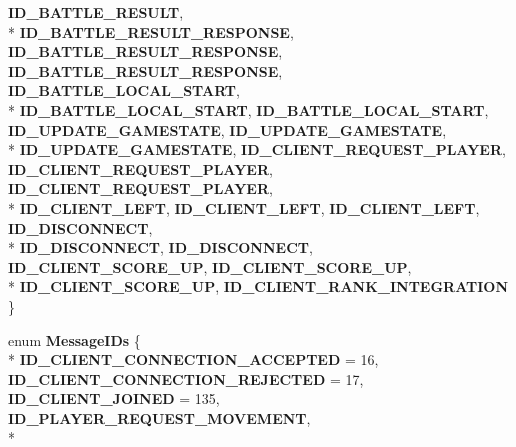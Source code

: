 \begin{DoxyCompactItemize}
{\bfseries I\-D\-\_\-\-B\-A\-T\-T\-L\-E\-\_\-\-R\-E\-S\-U\-L\-T}, 
\\*
{\bfseries I\-D\-\_\-\-B\-A\-T\-T\-L\-E\-\_\-\-R\-E\-S\-U\-L\-T\-\_\-\-R\-E\-S\-P\-O\-N\-S\-E}, 
{\bfseries I\-D\-\_\-\-B\-A\-T\-T\-L\-E\-\_\-\-R\-E\-S\-U\-L\-T\-\_\-\-R\-E\-S\-P\-O\-N\-S\-E}, 
{\bfseries I\-D\-\_\-\-B\-A\-T\-T\-L\-E\-\_\-\-R\-E\-S\-U\-L\-T\-\_\-\-R\-E\-S\-P\-O\-N\-S\-E}, 
{\bfseries I\-D\-\_\-\-B\-A\-T\-T\-L\-E\-\_\-\-L\-O\-C\-A\-L\-\_\-\-S\-T\-A\-R\-T}, 
\\*
{\bfseries I\-D\-\_\-\-B\-A\-T\-T\-L\-E\-\_\-\-L\-O\-C\-A\-L\-\_\-\-S\-T\-A\-R\-T}, 
{\bfseries I\-D\-\_\-\-B\-A\-T\-T\-L\-E\-\_\-\-L\-O\-C\-A\-L\-\_\-\-S\-T\-A\-R\-T}, 
{\bfseries I\-D\-\_\-\-U\-P\-D\-A\-T\-E\-\_\-\-G\-A\-M\-E\-S\-T\-A\-T\-E}, 
{\bfseries I\-D\-\_\-\-U\-P\-D\-A\-T\-E\-\_\-\-G\-A\-M\-E\-S\-T\-A\-T\-E}, 
\\*
{\bfseries I\-D\-\_\-\-U\-P\-D\-A\-T\-E\-\_\-\-G\-A\-M\-E\-S\-T\-A\-T\-E}, 
{\bfseries I\-D\-\_\-\-C\-L\-I\-E\-N\-T\-\_\-\-R\-E\-Q\-U\-E\-S\-T\-\_\-\-P\-L\-A\-Y\-E\-R}, 
{\bfseries I\-D\-\_\-\-C\-L\-I\-E\-N\-T\-\_\-\-R\-E\-Q\-U\-E\-S\-T\-\_\-\-P\-L\-A\-Y\-E\-R}, 
{\bfseries I\-D\-\_\-\-C\-L\-I\-E\-N\-T\-\_\-\-R\-E\-Q\-U\-E\-S\-T\-\_\-\-P\-L\-A\-Y\-E\-R}, 
\\*
{\bfseries I\-D\-\_\-\-C\-L\-I\-E\-N\-T\-\_\-\-L\-E\-F\-T}, 
{\bfseries I\-D\-\_\-\-C\-L\-I\-E\-N\-T\-\_\-\-L\-E\-F\-T}, 
{\bfseries I\-D\-\_\-\-C\-L\-I\-E\-N\-T\-\_\-\-L\-E\-F\-T}, 
{\bfseries I\-D\-\_\-\-D\-I\-S\-C\-O\-N\-N\-E\-C\-T}, 
\\*
{\bfseries I\-D\-\_\-\-D\-I\-S\-C\-O\-N\-N\-E\-C\-T}, 
{\bfseries I\-D\-\_\-\-D\-I\-S\-C\-O\-N\-N\-E\-C\-T}, 
{\bfseries I\-D\-\_\-\-C\-L\-I\-E\-N\-T\-\_\-\-S\-C\-O\-R\-E\-\_\-\-U\-P}, 
{\bfseries I\-D\-\_\-\-C\-L\-I\-E\-N\-T\-\_\-\-S\-C\-O\-R\-E\-\_\-\-U\-P}, 
\\*
{\bfseries I\-D\-\_\-\-C\-L\-I\-E\-N\-T\-\_\-\-S\-C\-O\-R\-E\-\_\-\-U\-P}, 
{\bfseries I\-D\-\_\-\-C\-L\-I\-E\-N\-T\-\_\-\-R\-A\-N\-K\-\_\-\-I\-N\-T\-E\-G\-R\-A\-T\-I\-O\-N}
 \}
\item 
enum {\bfseries Message\-I\-Ds} \{ \\*
{\bfseries I\-D\-\_\-\-C\-L\-I\-E\-N\-T\-\_\-\-C\-O\-N\-N\-E\-C\-T\-I\-O\-N\-\_\-\-A\-C\-C\-E\-P\-T\-E\-D} = 16, 
{\bfseries I\-D\-\_\-\-C\-L\-I\-E\-N\-T\-\_\-\-C\-O\-N\-N\-E\-C\-T\-I\-O\-N\-\_\-\-R\-E\-J\-E\-C\-T\-E\-D} = 17, 
{\bfseries I\-D\-\_\-\-C\-L\-I\-E\-N\-T\-\_\-\-J\-O\-I\-N\-E\-D} = 135, 
{\bfseries I\-D\-\_\-\-P\-L\-A\-Y\-E\-R\-\_\-\-R\-E\-Q\-U\-E\-S\-T\-\_\-\-M\-O\-V\-E\-M\-E\-N\-T}, 
\\*

\end{DoxyCompactItemize}
